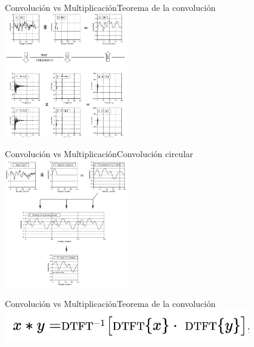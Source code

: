 \begin{frame}[t]{Convolución vs Multiplicación}{Teorema de la convolución}
   \center\includegraphics[width=0.4\textwidth]{5_clase/teorema_conv1}
   \vfill
\end{frame}
\begin{frame}[t]{Convolución vs Multiplicación}{Convolución circular}
   \center\includegraphics[width=0.4\textwidth]{5_clase/teorema_conv2}
   \vfill
\end{frame}
\begin{frame}[t]{Convolución vs Multiplicación}{Teorema de la convolución}
   \center\includegraphics[width=0.8\textwidth]{5_clase/teorema_conv_eq}
   \vfill
\end{frame}
